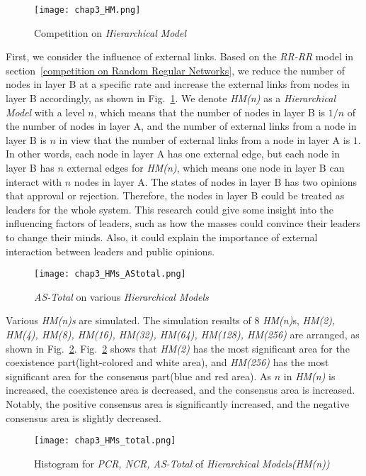 \begin{figure}[!htb]
	\centering
	\texttt{[image: chap3\_HM.png]}
	\caption{Competition on \textit{Hierarchical Model}}
	\label{chap3_HM}
\end{figure}
First, we consider the influence of external links. Based on the \textit{RR-RR} model in section~\ref{competition on Random Regular Networks}, we reduce the number of nodes in layer B at a specific rate and increase the external links from nodes in layer B accordingly, as shown in Fig.~\ref{chap3_HM}.  We denote \textit{HM(n)} as a \textit{Hierarchical Model} with a level $n$, which means that the number of nodes in layer B is $1/n$ of the number of nodes in layer A, and the number of external links from a node in layer B is $n$ in view that the number of external links from a node in layer A is $1$. In other words, each node in layer A has one external edge, but each node in layer B has $n$ external edges for \textit{HM(n)}, which means one node in layer B can interact with $n$ nodes in layer A. The states of nodes in layer B has two opinions that approval or rejection. Therefore, the nodes in layer B could be treated as leaders for the whole system. This research could give some insight into the influencing factors of leaders, such as how the masses could convince their leaders to change their minds. Also, it could explain the importance of external interaction between leaders and public opinions.   

\begin{figure}[!htb]
	\centering
	\texttt{[image: chap3\_HMs\_AStotal.png]}
	\caption{\textit{AS-Total} on various \textit{Hierarchical Models}}
	\label{chap3_HMs_AStotal}
\end{figure}

Various \textit{HM(n)s} are simulated.  The simulation results of $8$ \textit{HM(n)}s, \textit{HM(2), HM(4), HM(8), HM(16), HM(32), HM(64), HM(128), HM(256)} are arranged, as shown in Fig.~\ref{chap3_HMs_AStotal}. Fig.~\ref{chap3_HMs_AStotal} shows that \textit{HM(2)} has the most significant area for the coexistence part(light-colored and white area), and \textit{HM(256)} has the most significant area for the consensus part(blue and red area). As $n$ in \textit{HM(n)} is increased, the coexistence area is decreased, and the consensus area is increased. Notably, the positive consensus area is significantly increased, and the negative consensus area is slightly decreased.

\begin{figure}[!htb]
	\centering
	\texttt{[image: chap3\_HMs\_total.png]}
	\caption{Histogram for \textit{PCR, NCR, AS-Total} of \textit{Hierarchical Models(HM(n))}}
	\label{chap3_HMs_total}
\end{figure}

